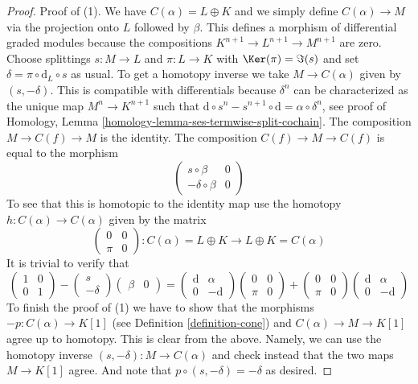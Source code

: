 \begin{proof}
Proof of (1). We have $C(\alpha) = L \oplus K$ and we simply define
$C(\alpha) \to M$ via the projection onto $L$ followed by $\beta$.
This defines a morphism of differential graded modules because the
compositions $K^{n + 1} \to L^{n + 1} \to M^{n + 1}$ are zero.
Choose splittings $s : M \to L$ and $\pi : L \to K$ with
$\Ker(\pi) = \Im(s)$ and set
$\delta = \pi \circ \text{d}_L \circ s$ as usual.
To get a homotopy inverse we take
$M \to C(\alpha)$ given by $(s , -\delta)$. This is compatible with
differentials because $\delta^n$ can be characterized as the
unique map $M^n \to K^{n + 1}$ such that
$\text{d} \circ s^n - s^{n + 1} \circ \text{d} = \alpha \circ \delta^n$,
see proof of
Homology, Lemma \ref{homology-lemma-ses-termwise-split-cochain}.
The composition $M \to C(f) \to M$ is the identity.
The composition $C(f) \to M \to C(f)$ is equal to the morphism
$$
\left(
\begin{matrix}
s \circ \beta & 0 \\
-\delta \circ \beta & 0
\end{matrix}
\right)
$$
To see that this is homotopic to the identity map
use the homotopy $h : C(\alpha) \to C(\alpha)$
given by the matrix
$$
\left(
\begin{matrix}
0 & 0 \\
\pi & 0
\end{matrix}
\right) :
C(\alpha) = L \oplus K
\to
L \oplus K = C(\alpha)
$$
It is trivial to verify that
$$
\left(
\begin{matrix}
1 & 0 \\
0 & 1
\end{matrix}
\right)
-
\left(
\begin{matrix}
s \\
-\delta
\end{matrix}
\right)
\left(
\begin{matrix}
\beta & 0
\end{matrix}
\right)
=
\left(
\begin{matrix}
\text{d} & \alpha \\
0 & -\text{d}
\end{matrix}
\right)
\left(
\begin{matrix}
0 & 0 \\
\pi & 0
\end{matrix}
\right)
+
\left(
\begin{matrix}
0 & 0 \\
\pi & 0
\end{matrix}
\right)
\left(
\begin{matrix}
\text{d} & \alpha \\
0 & -\text{d}
\end{matrix}
\right)
$$
To finish the proof of (1) we have to show that the morphisms
$-p : C(\alpha) \to K[1]$ (see
Definition \ref{definition-cone})
and $C(\alpha) \to M \to K[1]$ agree up
to homotopy. This is clear from the above. Namely, we can use the homotopy
inverse $(s, -\delta) : M \to C(\alpha)$
and check instead that the two maps
$M \to K[1]$ agree. And note that
$p \circ (s, -\delta) = -\delta$ as desired.


\end{proof}
